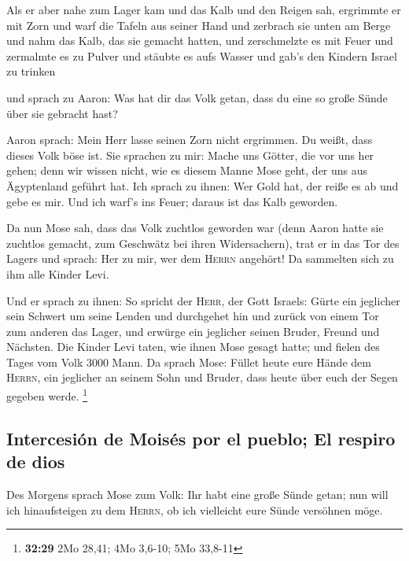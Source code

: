 Als er aber nahe zum Lager kam und das Kalb und den
Reigen sah, ergrimmte er mit Zorn und warf die Tafeln aus seiner Hand
und zerbrach sie unten am Berge  und nahm das Kalb, das
sie gemacht hatten, und zerschmelzte es mit Feuer und zermalmte es zu
Pulver und stäubte es aufs Wasser und gab's den Kindern Israel zu
trinken

 und sprach zu Aaron: Was hat dir das Volk getan, dass du
eine so große Sünde über sie gebracht hast?

 Aaron sprach: Mein Herr lasse seinen Zorn nicht
ergrimmen. Du weißt, dass dieses Volk böse ist.  Sie
sprachen zu mir: Mache uns Götter, die vor uns her gehen; denn wir
wissen nicht, wie es diesem Manne Mose geht, der uns aus Ägyptenland
geführt hat.  Ich sprach zu ihnen: Wer Gold hat, der
reiße es ab und gebe es mir. Und ich warf's ins Feuer; daraus ist das
Kalb geworden.

 Da nun Mose sah, dass das Volk zuchtlos geworden war
(denn Aaron hatte sie zuchtlos gemacht, zum Geschwätz bei ihren
Widersachern),  trat er in das Tor des Lagers und sprach:
Her zu mir, wer dem \textsc{Herrn} angehört! Da sammelten sich zu ihm
alle Kinder Levi.

 Und er sprach zu ihnen: So spricht der \textsc{Herr},
der Gott Israels: Gürte ein jeglicher sein Schwert um seine Lenden und
durchgehet hin und zurück von einem Tor zum anderen das Lager, und
erwürge ein jeglicher seinen Bruder, Freund und Nächsten.
 Die Kinder Levi taten, wie ihnen Mose gesagt hatte; und
fielen des Tages vom Volk 3000 Mann.  Da sprach Mose:
Füllet heute eure Hände dem \textsc{Herrn}, ein jeglicher an seinem Sohn
und Bruder, dass heute über euch der Segen gegeben werde. \footnote{\textbf{32:29}
  2Mo 28,41; 4Mo 3,6-10; 5Mo 33,8-11}

\hypertarget{intercesiuxf3n-de-moisuxe9s-por-el-pueblo-el-respiro-de-dios}{%
\subsection{Intercesión de Moisés por el pueblo; El respiro de
dios}\label{intercesiuxf3n-de-moisuxe9s-por-el-pueblo-el-respiro-de-dios}}

 Des Morgens sprach Mose zum Volk: Ihr habt eine große
Sünde getan; nun will ich hinaufsteigen zu dem \textsc{Herrn}, ob ich
vielleicht eure Sünde versöhnen möge.

